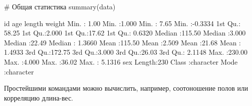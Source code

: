 \documentclass[
  letterpaper,
  DIV=11,
  numbers=noendperiod]{scrreprt}
\newenvironment{Shaded}{\begin{snugshade}}{\end{snugshade}}
\newcommand{\CommentTok}[1]{\textcolor[rgb]{0.37,0.37,0.37}{#1}}
\newcommand{\DecValTok}[1]{\textcolor[rgb]{0.68,0.00,0.00}{#1}}
\newcommand{\FloatTok}[1]{\textcolor[rgb]{0.68,0.00,0.00}{#1}}
\newcommand{\FunctionTok}[1]{\textcolor[rgb]{0.28,0.35,0.67}{#1}}
\newcommand{\NormalTok}[1]{\textcolor[rgb]{0.00,0.23,0.31}{#1}}
\newcommand{\SpecialCharTok}[1]{\textcolor[rgb]{0.37,0.37,0.37}{#1}}
\begin{document}
\begin{Shaded}
\begin{Highlighting}[]
\CommentTok{\# Общая статистика}
\FunctionTok{summary}\NormalTok{(data)}
\end{Highlighting}
\end{Shaded}

\begin{Shaded}
\begin{Highlighting}[]
\NormalTok{       id              age            length          weight       }
\NormalTok{ Min.   }\SpecialCharTok{:}  \FloatTok{1.00}\NormalTok{   Min.   }\SpecialCharTok{:}\FloatTok{1.000}\NormalTok{   Min.   }\SpecialCharTok{:} \FloatTok{7.65}\NormalTok{   Min.   }\SpecialCharTok{:{-}}\FloatTok{0.3334}  
 \DecValTok{1}\NormalTok{st Qu.}\SpecialCharTok{:} \FloatTok{58.25}   \DecValTok{1}\NormalTok{st Qu.}\SpecialCharTok{:}\FloatTok{2.000}   \DecValTok{1}\NormalTok{st Qu.}\SpecialCharTok{:}\FloatTok{17.62}   \DecValTok{1}\NormalTok{st Qu.}\SpecialCharTok{:} \FloatTok{0.6320}  
\NormalTok{ Median }\SpecialCharTok{:}\FloatTok{115.50}\NormalTok{   Median }\SpecialCharTok{:}\FloatTok{3.000}\NormalTok{   Median }\SpecialCharTok{:}\FloatTok{22.49}\NormalTok{   Median }\SpecialCharTok{:} \FloatTok{1.3660}  
\NormalTok{ Mean   }\SpecialCharTok{:}\FloatTok{115.50}\NormalTok{   Mean   }\SpecialCharTok{:}\FloatTok{2.509}\NormalTok{   Mean   }\SpecialCharTok{:}\FloatTok{21.68}\NormalTok{   Mean   }\SpecialCharTok{:} \FloatTok{1.4933}  
 \DecValTok{3}\NormalTok{rd Qu.}\SpecialCharTok{:}\FloatTok{172.75}   \DecValTok{3}\NormalTok{rd Qu.}\SpecialCharTok{:}\FloatTok{3.000}   \DecValTok{3}\NormalTok{rd Qu.}\SpecialCharTok{:}\FloatTok{26.03}   \DecValTok{3}\NormalTok{rd Qu.}\SpecialCharTok{:} \FloatTok{2.1148}  
\NormalTok{ Max.   }\SpecialCharTok{:}\FloatTok{230.00}\NormalTok{   Max.   }\SpecialCharTok{:}\FloatTok{4.000}\NormalTok{   Max.   }\SpecialCharTok{:}\FloatTok{36.02}\NormalTok{   Max.   }\SpecialCharTok{:} \FloatTok{5.1316}  
\NormalTok{     sex           }
\NormalTok{ Length}\SpecialCharTok{:}\DecValTok{230}        
\NormalTok{ Class }\SpecialCharTok{:}\NormalTok{character  }
\NormalTok{ Mode  }\SpecialCharTok{:}\NormalTok{character  }
\end{Highlighting}
\end{Shaded}

Простейшими командами можно вычислить, например, соотоношение полов или
корреляцию длина-вес.

\begin{Shaded}
\end{Shaded}
\end{document}
